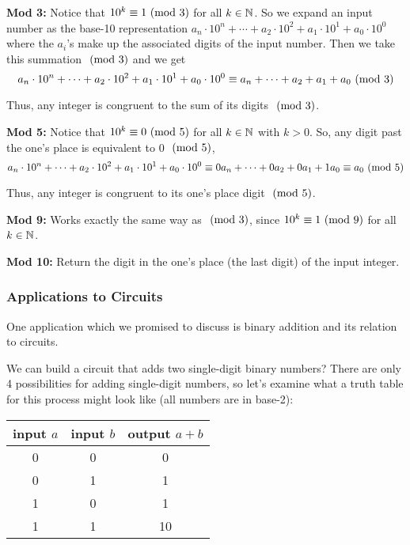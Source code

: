 \documentclass[main.tex]{subfiles}
\begin{document}
\begin{boxx}
	\textbf{Mod 3:} Notice that \(10^k \equiv 1 \ (\mathrm{mod}\ 3)\) for all \(k \in \mathbb{N}\). So we expand an input number as the base-10 representation \(a_n \cdot 10^n + \cdots + a_2 \cdot 10^2 + a_1 \cdot 10^1 + a_0 \cdot 10^0\) where the \(a_i\)'s make up the associated digits of the input number. Then we take this summation \(\ (\mathrm{mod}\ 3)\) and we get \[a_n \cdot 10^n + \cdots + a_2 \cdot 10^2 + a_1 \cdot 10^1 + a_0 \cdot 10^0 \equiv a_n + \cdots + a_2 + a_1 + a_0 \ (\mathrm{mod}\ 3)\]
	
	Thus, any integer is congruent to the sum of its digits \(\ (\mathrm{mod}\ 3)\).
\end{boxx}

\begin{boxx}
	\textbf{Mod 5:} Notice that \(10^k \equiv 0 \ (\mathrm{mod}\ 5)\) for all \(k \in \mathbb{N}\) with \(k > 0\). So, any digit past the one's place is equivalent to 0 \(\ (\mathrm{mod}\ 5)\), \[a_n \cdot 10^n + \cdots + a_2 \cdot 10^2 + a_1 \cdot 10^1 + a_0 \cdot 10^0 \equiv 0a_n + \cdots + 0a_2 + 0a_1 + 1a_0 \equiv a_0 \ (\mathrm{mod}\ 5)\]
	
	Thus, any integer is congruent to its one's place digit \(\ (\mathrm{mod}\ 5)\).
\end{boxx}

\begin{boxx}
	\textbf{Mod 9:} Works exactly the same way as \(\ (\mathrm{mod}\ 3)\), since \(10^k \equiv 1 \ (\mathrm{mod}\ 9)\) for all \(k \in \mathbb{N}\).
\end{boxx}

\begin{boxx}
	\textbf{Mod 10:} Return the digit in the one's place (the last digit) of the input integer.
\end{boxx}

\subsubsection{Applications to Circuits}

One application which we promised to discuss is binary addition and its relation to circuits.

We can build a circuit that adds two single-digit binary numbers? There are only 4 possibilities for adding single-digit numbers, so let's examine what a truth table for this process might look like (all numbers are in base-2):
	
\begin{center}
	\begin{tabular}{cc|c}
		input \(a\) & input \(b\) & output \(a + b\) \\
		\midrule
		0 & 0 & 0 \\
		0 & 1 & 1 \\
		1 & 0 & 1 \\
		1 & 1 & 10 \\
	\end{tabular}
\end{center}
\end{document}
